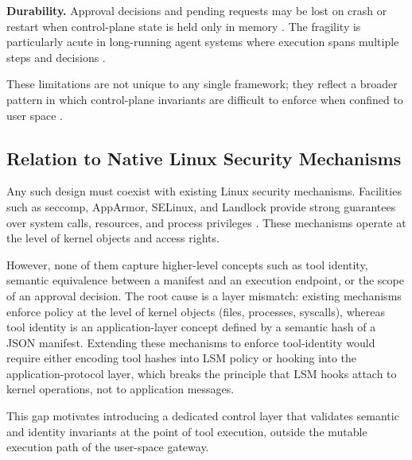 \textbf{Durability.}
Approval decisions and pending requests may be lost on crash or restart when control-plane state is held only in memory \cite{packer2023memgpt}.
The fragility is particularly acute in long-running agent systems where execution spans multiple steps and decisions \cite{wang2023voyager, yang2024swe}.

These limitations are not unique to any single framework; they reflect a broader pattern in which control-plane invariants \cite{lim2024compartmentalization} are difficult to enforce when confined to user space \cite{schneider2022sok, lefeuvre2024sok, ji2026seagent, shi2025progent}.



\subsection{Relation to Native Linux Security Mechanisms}

Any such design must coexist with existing Linux security mechanisms.
Facilities such as seccomp, AppArmor, SELinux, and Landlock provide strong guarantees over system calls, resources, and process privileges \cite{seccomp2026, lsm2026, apparmor2026, selinux2026, landlock2026}.
These mechanisms operate at the level of kernel objects and access rights.

However, none of them capture higher-level concepts such as tool identity, semantic equivalence between a manifest and an execution endpoint, or the scope of an approval decision.
The root cause is a layer mismatch: existing mechanisms enforce policy at the level of kernel objects (files, processes, syscalls), whereas tool identity is an application-layer concept defined by a semantic hash of a JSON manifest.
Extending these mechanisms to enforce tool-identity would require either encoding tool hashes into LSM policy or hooking into the application-protocol layer, which breaks the principle that LSM hooks attach to kernel operations, not to application messages.

This gap motivates introducing a dedicated control layer that validates semantic and identity invariants at the point of tool execution, outside the mutable execution path of the user-space gateway.


